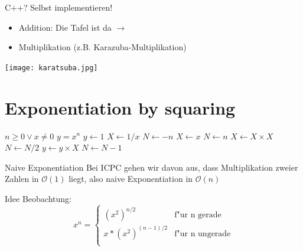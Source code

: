 \documentclass[18pt]{beamer}
\begin{document}
\begin{frame} {C++? Selbst implementieren!}
\begin {itemize}
\item Addition: Die Tafel ist da $\longrightarrow{}$
\item Multiplikation (z.B. Karazuba-Multiplikation)
\end {itemize}
\texttt{[image: karatsuba.jpg]}
\end{frame}

\section {Exponentiation by squaring}

\begin{algorithm}
\scriptsize 
\caption{Bereche $y = x^n$ naiv}
\begin{algorithmic}
 
\REQUIRE $n \geq 0 \vee x \neq 0$
\ENSURE $y = x^n$
\STATE $y \leftarrow 1$
\STATE $X \leftarrow 1 / x$
\STATE $N \leftarrow -n$
\ELSE
\STATE $X \leftarrow x$
\STATE $N \leftarrow n$
\ENDIF
{}
\STATE $X \leftarrow X \times X$
\STATE $N \leftarrow N / 2$
\ELSE[$N$ is odd]
\STATE $y \leftarrow y \times X$
\STATE $N \leftarrow N - 1$
\ENDIF
\ENDWHILE
\end{algorithmic}
\end{algorithm}

\begin{frame} {Naive Exponentiation}
Bei ICPC gehen wir davon aus, dass Multiplikation zweier Zahlen in $\mathcal{O}(1)$ liegt, also naive Exponentiation in $\mathcal{O}(n)$
\end{frame}

\begin{frame} {Idee}
Beobachtung:
\begin{equation}
   x^{n} =
   \begin{cases}
     (x^{2})^{n/2} & \text{f"ur n gerade} \\
      x*(x^{2})^{(n-1)/2} & \text{f"ur n ungerade} \\
   \end{cases}
\end{equation}
\end{frame}


\begin{algorithm}
\scriptsize 
\caption{Exponentiation(n, x) (rekursiv)}
\begin{algorithmic}
\ELSE {}
\ENDIF
\end{algorithmic}
\end{algorithm}
\end{document}
